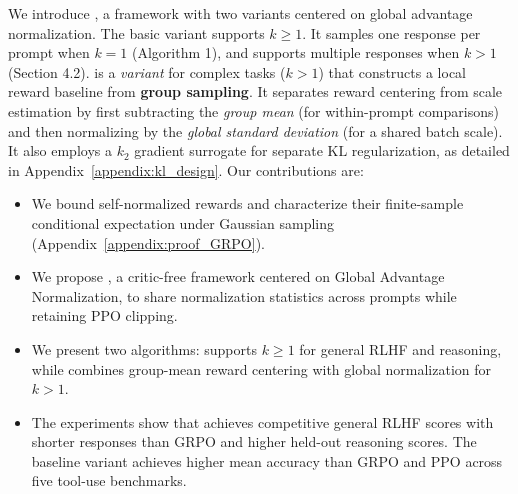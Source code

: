 We introduce \ours, a framework with two variants centered on global advantage normalization. The basic variant supports $k \ge 1$. It samples one response per prompt when $k=1$ (Algorithm 1), and supports multiple responses when $k>1$ (Section 4.2). \varn is a \textit{variant} for complex tasks ($k>1$) that constructs a local reward baseline from \textbf{group sampling}. It separates reward centering from scale estimation by first subtracting the \textit{group mean} (for within-prompt comparisons) and then normalizing by the \textit{global standard deviation} (for a shared batch scale). It also employs a $k_2$ gradient surrogate for separate $\mathrm{KL}$ regularization, as detailed in Appendix~\ref{appendix:kl_design}. Our contributions are:
\begin{itemize}
    \item We bound self-normalized rewards and characterize their finite-sample conditional expectation under Gaussian sampling (Appendix~\ref{appendix:proof_GRPO}).
    \item We propose \ours, a critic-free framework centered on Global Advantage Normalization, to share normalization statistics across prompts while retaining PPO clipping.

    \item We present two algorithms: \ours supports $k \ge 1$ for general RLHF and reasoning, while \varn combines group-mean reward centering with global normalization for $k>1$.

    \item The experiments show that \ours achieves competitive general RLHF scores with shorter responses than GRPO and higher held-out reasoning scores. The baseline variant achieves higher mean accuracy than GRPO and PPO across five tool-use benchmarks.
\end{itemize}